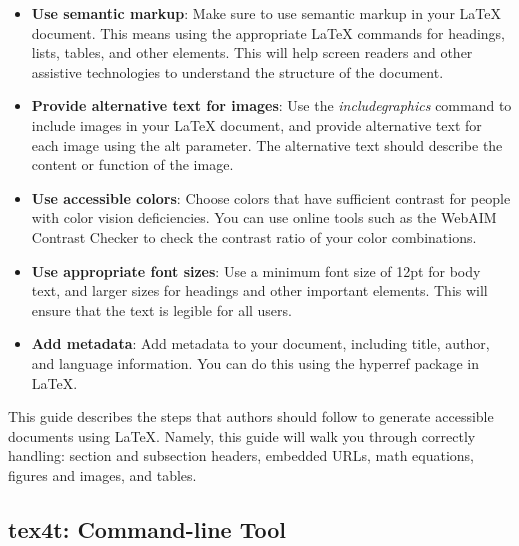 \documentclass[lang=en]{article}
\begin{document}
\begin{itemize}
\item \textbf{Use semantic markup}: Make sure to use semantic markup in your
  LaTeX document. This means using the appropriate LaTeX commands for
  headings, lists, tables, and other elements. This will help screen readers and
  other assistive technologies to understand the structure of the document.

\item \textbf{Provide alternative text for images}: Use the
  \textit{includegraphics} command to include images in your LaTeX document,
  and provide alternative text for each image using the alt parameter. The
  alternative text should describe the content or function of the image.

\item \textbf{Use accessible colors}: Choose colors that have sufficient
  contrast for people with color vision deficiencies. You can use online tools
  such as the WebAIM Contrast Checker to check the contrast ratio of your color
  combinations.

\item \textbf{Use appropriate font sizes}: Use a minimum font size of 12pt for
  body text, and larger sizes for headings and other important elements. This
  will ensure that the text is legible for all users.

\item \textbf{Add metadata}: Add metadata to your document, including title,
  author, and language information. You can do this using the hyperref package
  in LaTeX.


\end{itemize}


This guide describes the steps that authors should follow to generate accessible
documents using LaTeX. Namely, this guide will walk you through correctly
handling: section and subsection headers, embedded URLs, math equations, figures
and images, and tables.


\subsection{tex4t: Command-line Tool}
\end{document}
